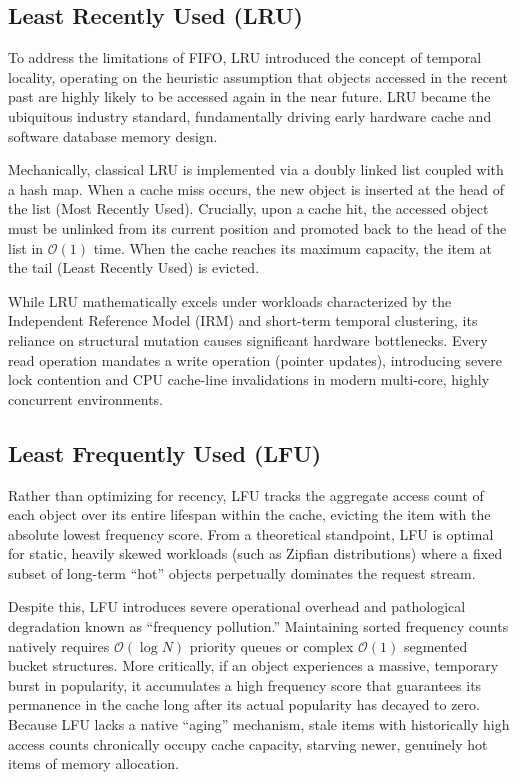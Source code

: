 \subsection{Least Recently Used (LRU)}
To address the limitations of FIFO, LRU introduced the concept of temporal locality, operating on the heuristic assumption that objects accessed in the recent past are highly likely to be accessed again in the near future. LRU became the ubiquitous industry standard, fundamentally driving early hardware cache and software database memory design.

Mechanically, classical LRU is implemented via a doubly linked list coupled with a hash map. When a cache miss occurs, the new object is inserted at the head of the list (Most Recently Used). Crucially, upon a cache hit, the accessed object must be unlinked from its current position and promoted back to the head of the list in $\mathcal{O}(1)$ time. When the cache reaches its maximum capacity, the item at the tail (Least Recently Used) is evicted.

While LRU mathematically excels under workloads characterized by the Independent Reference Model (IRM) and short-term temporal clustering, its reliance on structural mutation causes significant hardware bottlenecks. Every read operation mandates a write operation (pointer updates), introducing severe lock contention and CPU cache-line invalidations in modern multi-core, highly concurrent environments.

\subsection{Least Frequently Used (LFU)}
Rather than optimizing for recency, LFU tracks the aggregate access count of each object over its entire lifespan within the cache, evicting the item with the absolute lowest frequency score. From a theoretical standpoint, LFU is optimal for static, heavily skewed workloads (such as Zipfian distributions) where a fixed subset of long-term ``hot'' objects perpetually dominates the request stream.

Despite this, LFU introduces severe operational overhead and pathological degradation known as ``frequency pollution.'' Maintaining sorted frequency counts natively requires $\mathcal{O}(\log N)$ priority queues or complex $\mathcal{O}(1)$ segmented bucket structures. More critically, if an object experiences a massive, temporary burst in popularity, it accumulates a high frequency score that guarantees its permanence in the cache long after its actual popularity has decayed to zero. Because LFU lacks a native ``aging'' mechanism, stale items with historically high access counts chronically occupy cache capacity, starving newer, genuinely hot items of memory allocation.

